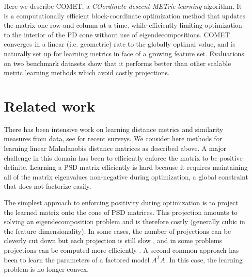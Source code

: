 \documentclass{article}
\begin{document}

Here we describe COMET, a {\em{COordinate-descent METric learning}} algorithm. It is a computationally efficient block-coordinate optimization method that updates the matrix one row and column at a time, while efficiently limiting optimization to the interior of the PD cone without use of eigendecompositions. COMET converges in a linear (i.e. geometric) rate to the globally optimal value, and is naturally set up for learning metrics in face of a growing feature set. Evaluations on two benchmark datasets show that it performs better than other scalable metric learning methods which avoid costly projections. 



\section{Related work}
There has been intensive work on learning distance metrics and similarity measures from data, see \citet{bellet2013survey, kulis2012survey} for recent surveys. We consider here methods for learning linear Mahalanobis distance matrices as described above. A major challenge in this domain has been to efficiently enforce the matrix to be positive definite. Learning a PSD matrix efficiently is hard because it requires maintaining all of the matrix eigenvalues non-negative during optimization, a global constraint that does not factorize easily.

The simplest approach to enforcing positivity during optimization is to project the learned matrix onto the cone of PSD matrices. This projection amounts to solving an eigendecomposition problem and is therefore costly (generally cubic in the feature dimensionality). In some cases, the number of projections can be cleverly cut down but each projection is still slow \cite{qianHD, qian}, and in some problems projections can be computed more efficiently \cite{shalev2004online}. A second common approach has been to learn the parameters of a factored model $A^TA$. In this case, the learning problem is no longer convex. 
\end{document}
